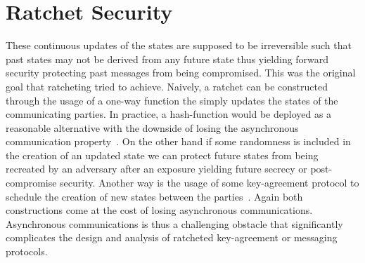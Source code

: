 \documentclass[11pt,a4paper,twoside,openright,bibliography=totoc]{scrbook}
\begin{document}
\section{Ratchet Security}
\label{sec:ratchet-security}

These continuous updates of the states are supposed to be irreversible
such that past states may not be derived from any future state thus
yielding forward security protecting past messages from being
compromised. This was the original goal that ratcheting tried to
achieve. Naively, a ratchet can be constructed through the usage of a
one-way function the simply updates the states of the communicating
parties. In practice, a hash-function would be deployed as a
reasonable alternative with the downside of losing the asynchronous
communication property~\cite{bellare2003forward}. On the other hand if
some randomness is included in the creation of an updated state we can
protect future states from being recreated by an adversary after an
exposure yielding future secrecy or post-compromise security. Another
way is the usage of some key-agreement protocol to schedule the
creation of new states between the parties~\cite{cohn2016post}.  Again
both constructions come at the cost of losing asynchronous
communications. Asynchronous communications is thus a challenging
obstacle that significantly complicates the design and analysis
of ratcheted key-agreement or messaging protocols.

\bigskip
\end{document}
